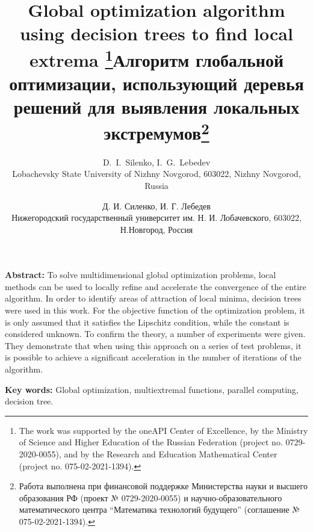 \documentclass[12pt, a4paper, russian]{article}
\begin{document}

\title{Global optimization algorithm using decision trees to find local extrema \thanks{The work was supported by the oneAPI Center of Excellence, by the Ministry of Science and Higher Education of the Russian Federation (project no. 0729-2020-0055), and by the Research and Education Mathematical Center (project no.  075-02-2021-1394).}}

\author{D.~I.~Silenko, I.~G.~Lebedev\\
	\small{Lobachevsky State University of Nizhny Novgorod, 603022, Nizhny Novgorod, Russia}
}
\date{}
\maketitle

\begin{small}
\textbf{Abstract:} To solve multidimensional global optimization problems, local methods can be used to locally refine and accelerate the convergence of the entire algorithm. In order to identify areas of attraction of local minima, decision trees were used in this work. For the objective function of the optimization problem, it is only assumed that it satisfies the Lipschitz condition, while the constant is considered unknown. To confirm the theory, a number of experiments were given. They demonstrate that when using this approach on a series of test problems, it is possible to achieve a significant acceleration in the number of iterations of the algorithm.

\textbf{Key words:} Global optimization, multiextremal functions, parallel computing, decision tree.
\end{small}

\renewcommand{\refname}{References}





\emptythanks
\title{Алгоритм глобальной оптимизации, использующий деревья решений для выявления локальных экстремумов\thanks{Работа выполнена при финансовой поддержке Министерства науки и высшего образования РФ (проект № 0729-2020-0055) и научно-образовательного математического центра “Математика технологий будущего” (соглашение № 075-02-2021-1394).}}

\author{Д. И. Силенко, И. Г. Лебедев\\
	\small{Нижегородский государственный университет им. Н. И. Лобачевского, 603022, Н.Новгород, Россия} 
}
\date{}
\maketitle
\end{document}
